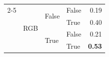 \documentclass{article}
\begin{document}
\begin{table}
\begin{center}
{\begin{tabular}{@{}llllr@{}}
    \cmidrule{2-5}
                                                                        & \multirow[c]{4}{*}{RGB}           & \multirow[c]{2}{*}{False} & False                     & 0.19 \\
                                                                        &                                   &                           & True                      & 0.40 \\
                                                                        &                                   & \multirow[c]{2}{*}{True}  & False                     & 0.21 \\
                                                                        &                                   &                           & True                      & \textbf{0.53} \\
   \bottomrule
\end{tabular}
}
    \end{center}
    \label{tab:grid-world-ablation-anthropic}
\end{table}
\end{document}

